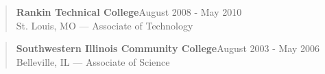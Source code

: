 \documentclass[../main.tex]{subfiles}
\begin{document}
\begin{quote}
\par\textbf{Rankin Technical College}\hfill August 2008 - May 2010\\
St. Louis, MO — Associate of Technology
\end{quote}
\begin{quote}

\textbf{Southwestern Illinois Community College}\hfill August 2003 - May 2006\\
Belleville, IL — Associate of Science
\end{quote}
\end{document}
